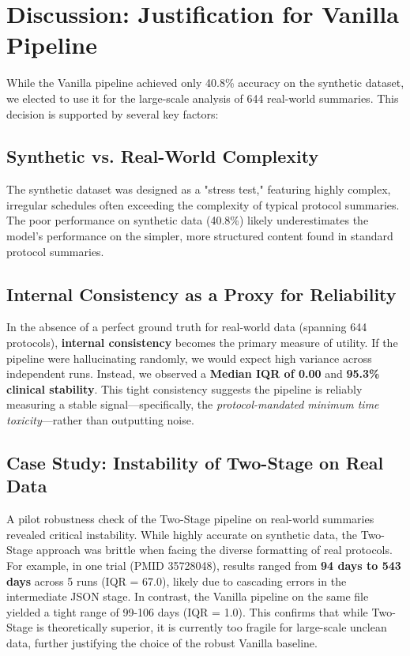 \documentclass[11pt, a4paper]{article}
\begin{document}
\section{Discussion: Justification for Vanilla Pipeline}
While the Vanilla pipeline achieved only 40.8\% accuracy on the synthetic dataset, we elected to use it for the large-scale analysis of 644 real-world summaries. This decision is supported by several key factors:

\subsection{Synthetic vs. Real-World Complexity}
The synthetic dataset was designed as a "stress test," featuring highly complex, irregular schedules often exceeding the complexity of typical protocol summaries. The poor performance on synthetic data (40.8\%) likely underestimates the model's performance on the simpler, more structured content found in standard protocol summaries.

\subsection{Internal Consistency as a Proxy for Reliability}
In the absence of a perfect ground truth for real-world data (spanning 644 protocols), \textbf{internal consistency} becomes the primary measure of utility. If the pipeline were hallucinating randomly, we would expect high variance across independent runs. Instead, we observed a \textbf{Median IQR of 0.00} and \textbf{95.3\% clinical stability}. This tight consistency suggests the pipeline is reliably measuring a stable signal---specifically, the \textit{protocol-mandated minimum time toxicity}---rather than outputting noise.

\subsection{Case Study: Instability of Two-Stage on Real Data}
A pilot robustness check of the Two-Stage pipeline on real-world summaries revealed critical instability. While highly accurate on synthetic data, the Two-Stage approach was brittle when facing the diverse formatting of real protocols.
For example, in one trial (PMID 35728048), results ranged from \textbf{94 days to 543 days} across 5 runs (IQR = 67.0), likely due to cascading errors in the intermediate JSON stage. In contrast, the Vanilla pipeline on the same file yielded a tight range of 99-106 days (IQR = 1.0). This confirms that while Two-Stage is theoretically superior, it is currently too fragile for large-scale unclean data, further justifying the choice of the robust Vanilla baseline.
\end{document}
